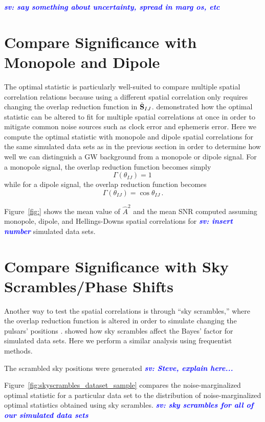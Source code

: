 \documentclass[twocolumn,aps,prd,superscriptaddress]{revtex4-1}
\newcommand{\sv}[1]{\textcolor{blue}{\it{\textbf{sv: #1}}} }
\begin{document}
\sv{say something about uncertainty, spread in marg os, etc}


\section{Compare Significance with Monopole and Dipole}
\label{sec:spatial}

The optimal statistic is particularly well-suited to compare multiple spatial correlation relations 
because using a different spatial correlation only requires changing the overlap reduction function 
in $\tilde{{\bf{S}}}_{IJ}$. 
\citet{thk+2016} demonstrated how the optimal statistic can be altered to fit for 
multiple spatial correlations at once in order to mitigate common noise sources such as 
clock error and ephemeris error. 
Here we compute the optimal statistic with monopole and dipole spatial correlations 
for the same simulated data sets as in the previous section in order to determine 
how well we can distinguish a GW background from a monopole or dipole signal. 
For a monopole signal, the overlap reduction function becomes simply
\[ \Gamma(\theta_{IJ}) = 1 \,\]
while for a dipole signal, the overlap reduction function becomes
\[ \Gamma(\theta_{IJ}) = \cos\theta_{IJ} \,. \]

Figure~\ref{fig:} shows the mean value of $\hat{A}^2$ and the mean SNR 
computed assuming monopole, dipole, and Hellings-Downs spatial correlations 
for \sv{insert number} simulated data sets.


\section{Compare Significance with Sky Scrambles/Phase Shifts}
\label{sec:skyscrambles}

Another way to test the spatial correlations is through ``sky scrambles,'' 
where the overlap reduction function is altered in order to simulate changing the pulsars' positions \citep{cs2016}. 
\citet{tlb+2017} showed how sky scrambles affect the Bayes' factor for simulated data sets. 
Here we perform a similar analysis using frequentist methods.

The scrambled sky positions were generated \sv{Steve, explain here...}

Figure~\ref{fig:skyscrambles_dataset_sample} compares the noise-marginalized optimal statistic 
for a particular data set to the 
distribution of noise-marginalized optimal statistics obtained using sky scrambles.
\sv{sky scrambles for all of our simulated data sets}
\end{document}
